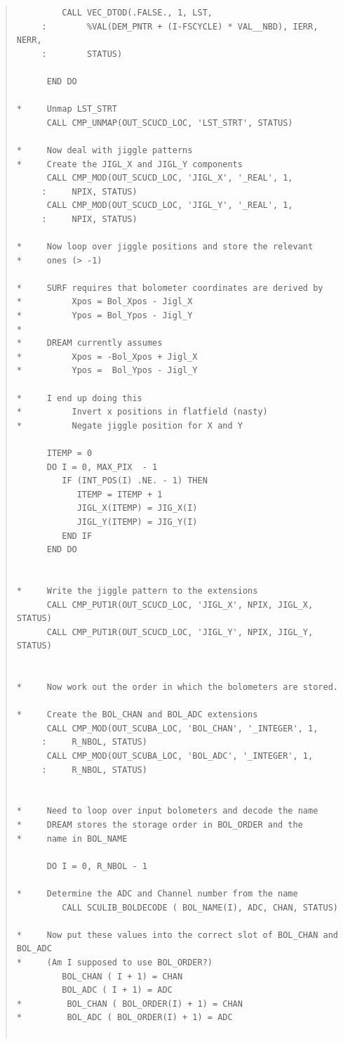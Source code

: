 \documentclass[twoside,11pt]{article}
\newenvironment{myquote}{\begin{quote}\begin{small}}{\end{small}\end{quote}}
\renewcommand{\_}{\texttt{\symbol{95}}}
\begin{document}
\begin{myquote}
\begin{verbatim}
         CALL VEC_DTOD(.FALSE., 1, LST,
     :        %VAL(DEM_PNTR + (I-FSCYCLE) * VAL__NBD), IERR, NERR,
     :        STATUS)

      END DO

*     Unmap LST_STRT
      CALL CMP_UNMAP(OUT_SCUCD_LOC, 'LST_STRT', STATUS)

*     Now deal with jiggle patterns
*     Create the JIGL_X and JIGL_Y components
      CALL CMP_MOD(OUT_SCUCD_LOC, 'JIGL_X', '_REAL', 1,
     :     NPIX, STATUS)
      CALL CMP_MOD(OUT_SCUCD_LOC, 'JIGL_Y', '_REAL', 1,
     :     NPIX, STATUS)

*     Now loop over jiggle positions and store the relevant
*     ones (> -1)

*     SURF requires that bolometer coordinates are derived by
*          Xpos = Bol_Xpos - Jigl_X
*          Ypos = Bol_Ypos - Jigl_Y
*
*     DREAM currently assumes
*          Xpos = -Bol_Xpos + Jigl_X
*          Ypos =  Bol_Ypos - Jigl_Y

*     I end up doing this
*          Invert x positions in flatfield (nasty)
*          Negate jiggle position for X and Y

      ITEMP = 0
      DO I = 0, MAX_PIX  - 1
         IF (INT_POS(I) .NE. - 1) THEN 
            ITEMP = ITEMP + 1
            JIGL_X(ITEMP) = JIG_X(I)
            JIGL_Y(ITEMP) = JIG_Y(I)
         END IF
      END DO


*     Write the jiggle pattern to the extensions
      CALL CMP_PUT1R(OUT_SCUCD_LOC, 'JIGL_X', NPIX, JIGL_X, STATUS)
      CALL CMP_PUT1R(OUT_SCUCD_LOC, 'JIGL_Y', NPIX, JIGL_Y, STATUS)


*     Now work out the order in which the bolometers are stored.

*     Create the BOL_CHAN and BOL_ADC extensions
      CALL CMP_MOD(OUT_SCUBA_LOC, 'BOL_CHAN', '_INTEGER', 1,
     :     R_NBOL, STATUS)
      CALL CMP_MOD(OUT_SCUBA_LOC, 'BOL_ADC', '_INTEGER', 1,
     :     R_NBOL, STATUS)


*     Need to loop over input bolometers and decode the name
*     DREAM stores the storage order in BOL_ORDER and the
*     name in BOL_NAME

      DO I = 0, R_NBOL - 1

*     Determine the ADC and Channel number from the name
         CALL SCULIB_BOLDECODE ( BOL_NAME(I), ADC, CHAN, STATUS)

*     Now put these values into the correct slot of BOL_CHAN and BOL_ADC
*     (Am I supposed to use BOL_ORDER?)
         BOL_CHAN ( I + 1) = CHAN
         BOL_ADC ( I + 1) = ADC
*         BOL_CHAN ( BOL_ORDER(I) + 1) = CHAN
*         BOL_ADC ( BOL_ORDER(I) + 1) = ADC


\end{verbatim}
\end{myquote}
\end{document}
